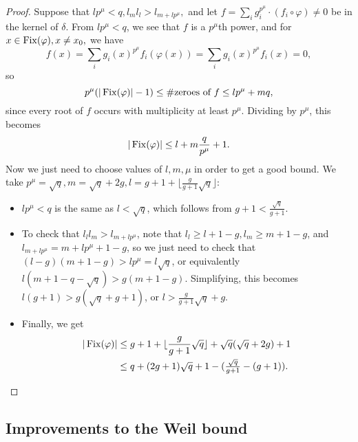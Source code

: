 \begin{proof}
Suppose that $lp^{\mu} < q, l_ml_l > l_{m+lp^{\mu}},$ and let $f = \sum_i g_i^{p^{\mu}} \cdot (f_i\circ \varphi) \ne 0$ be in the kernel of $\delta$. From $lp^{\mu} < q$, we see that $f$ is a $p^{\mu}$th power, and for $x \in \operatorname{Fix}(\varphi), x \ne x_0,$ we have
\[
f(x) = \sum_i g_i(x)^{p^{\mu}}f_i(\varphi(x)) = \sum_i g_i(x)^{p^{\mu}}f_i(x) = 0,
\]
so
\[
p^{\mu}(|\operatorname{Fix}(\varphi)|-1) \le \#\text{zeroes of }f \le lp^{\mu} + mq,
\]
since every root of $f$ occurs with multiplicity at least $p^{\mu}$. Dividing by $p^{\mu}$, this becomes
\[
|\operatorname{Fix}(\varphi)| \le l + m\frac{q}{p^{\mu}} + 1.
\]
Now we just need to choose values of $l, m, \mu$ in order to get a good bound. We take $p^{\mu} = \sqrt{q}, m = \sqrt{q} + 2g, l = g+1 + \lfloor\frac{g}{g+1}\sqrt{q}\rfloor$:
\begin{itemize}
\item $lp^{\mu} < q$ is the same as $l < \sqrt{q}$, which follows from $g+1 < \frac{\sqrt{q}}{g+1}$.

\item To check that $l_ll_m > l_{m+lp^{\mu}}$, note that $l_l \ge l+1-g, l_m \ge m+1-g$, and $l_{m+lp^{\mu}} = m + lp^{\mu} + 1-g$, so we just need to check that $(l-g)(m+1-g) > lp^{\mu} = l\sqrt{q}$, or equivalently $l(m+1-q-\sqrt{q}) > g(m+1-g)$. Simplifying, this becomes $l(g+1) > g(\sqrt{q}+g+1)$, or $l > \frac{g}{g+1}\sqrt{q} + g$.

\item Finally, we get
\begin{align*}
|\operatorname{Fix}(\varphi)| &\le g+1+\lfloor\frac{g}{g+1}\sqrt{q}\rfloor + \sqrt{q}(\sqrt{q}+2g)+1\\
&\le q + (2g+1)\sqrt{q} + 1 - (\tfrac{\sqrt{q}}{g+1} - (g+1)).\qedhere
\end{align*}
\end{itemize}
\end{proof}

\subsection{Improvements to the Weil bound}

